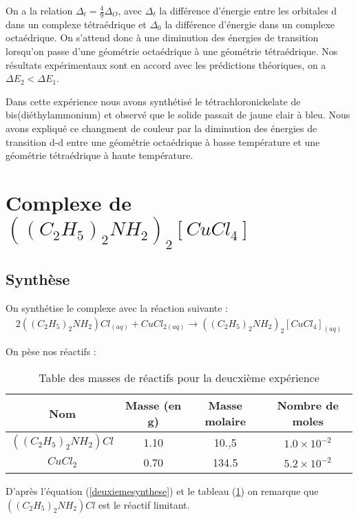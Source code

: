 \documentclass[12pt]{article}
\begin{document}
On a la relation $\Delta_t=\frac{4}{9}\Delta_O$, avec $\Delta_t$ la différence d'énergie entre les orbitales d dans un complexe tétraédrique et $\Delta_0$ la différence d'énergie dans un complexe octaédrique.
On s'attend donc à une diminution des énergies de transition lorsqu'on passe d'une géométrie octaédrique à une géométrie tétraédrique.
Nos résultats expérimentaux sont en accord avec les prédictions théoriques, on a $\Delta E_2 <  \Delta E_1$.

Dans cette expérience nous avons synthétisé le tétrachloronickelate de bis(diéthylammonium) et observé que le solide passait de jaune clair à bleu.
Nous avons expliqué ce changment de couleur par la diminution des énergies de transition d-d entre une géométrie octaédrique à basse température et une géométrie tétraédrique à haute température.

\section{Complexe  de $((C_2H_5)_2NH_2)_2[CuCl_4]$}
\subsection{Synthèse}
On synthétise le complexe avec la réaction suivante :
\begin{align}
    2((C_2H_5)_2NH_2)Cl_{(aq)} +  CuCl_{2(aq)} \longrightarrow ((C_2H_5)_2NH_2)_2[CuCl_4]_{(aq)}
\label{deuxiemesynthese}
\end{align}

On pèse nos réactifs :
\begin{table}[h!]
    \begin{center}
        \begin{tabular}{|c|c|c|c|}
            \hline
            Nom & Masse (en g) & Masse molaire & Nombre de moles \\
            \hline
            $((C_2H_5)_2NH_2)Cl$ & 1.10 & 10.,5 & $1.0\times 10^{-2}$ \\
            \hline
            $CuCl_2$ & 0.70 & 134.5 & $5.2 \times 10^{-2}$ \\
            \hline
        \end{tabular}
    \end{center}
    \caption{Table des masses de réactifs pour la deucxième expérience}
    \label{tab2:masse2}
\end{table}

D'après l'équation (\ref{deuxiemesynthese}) et le tableau (\ref{tab2:masse2}) on remarque que $((C_2H_5)_2NH_2)Cl$ est le réactif limitant.
\end{document}

